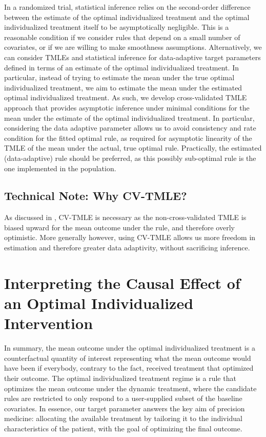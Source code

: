 \documentclass[
  12pt, krantz2,
]{krantz}
\theoremstyle{definition}
\theoremstyle{definition}
\theoremstyle{definition}
\newcommand{\1}{\mathbbm{1}}
\begin{document}
In a randomized trial, statistical inference relies on the second-order
difference between the estimate of the optimal individualized treatment and the
optimal individualized treatment itself to be asymptotically negligible. This is
a reasonable condition if we consider rules that depend on a small number of
covariates, or if we are willing to make smoothness assumptions. Alternatively,
we can consider TMLEs and statistical inference for data-adaptive target
parameters defined in terms of an estimate of the optimal individualized
treatment. In particular, instead of trying to estimate the mean under the true
optimal individualized treatment, we aim to estimate the mean under the
estimated optimal individualized treatment. As such, we develop cross-validated
TMLE approach that provides asymptotic inference under minimal conditions for
the mean under the estimate of the optimal individualized treatment. In
particular, considering the data adaptive parameter allows us to avoid
consistency and rate condition for the fitted optimal rule, as required for
asymptotic linearity of the TMLE of the mean under the actual, true optimal
rule. Practically, the estimated (data-adaptive) rule should be preferred, as
this possibly sub-optimal rule is the one implemented in the population.

\hypertarget{technical-note-why-cv-tmle}{%
\subsection{Technical Note: Why CV-TMLE?}\label{technical-note-why-cv-tmle}}

As discussed in \citet{vanderLaanLuedtke15}, CV-TMLE is necessary as the
non-cross-validated TMLE is biased upward for the mean outcome under the rule,
and therefore overly optimistic. More generally however, using CV-TMLE allows us
more freedom in estimation and therefore greater data adaptivity, without
sacrificing inference.

\hypertarget{interpreting-the-causal-effect-of-an-optimal-individualized-intervention}{%
\section{Interpreting the Causal Effect of an Optimal Individualized Intervention}\label{interpreting-the-causal-effect-of-an-optimal-individualized-intervention}}

In summary, the mean outcome under the optimal individualized treatment is a
counterfactual quantity of interest representing what the mean outcome would
have been if everybody, contrary to the fact, received treatment that optimized
their outcome. The optimal individualized treatment regime is a rule that
optimizes the mean outcome under the dynamic treatment, where the candidate
rules are restricted to only respond to a user-supplied subset of the baseline
covariates. In essence, our target parameter answers the key
aim of precision medicine: allocating the available treatment by tailoring it to
the individual characteristics of the patient, with the goal of optimizing the
final outcome.
\end{document}

